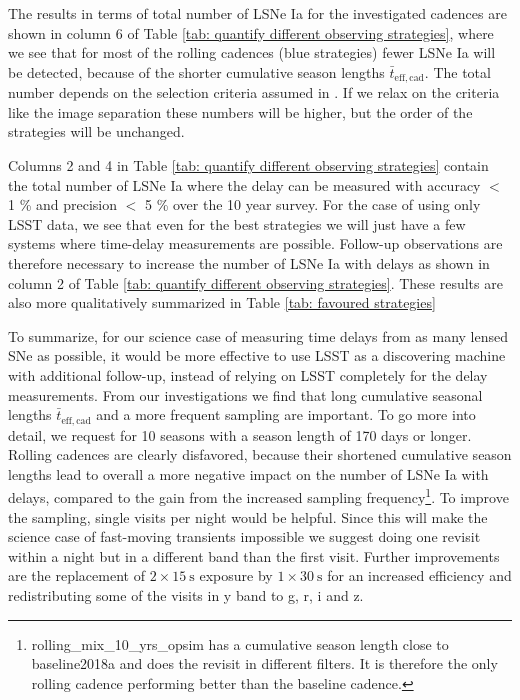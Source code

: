 The results in terms of total number of LSNe Ia for the investigated cadences are shown in column 6 of Table \ref{tab: quantify different observing strategies}, where we see that for most of the rolling cadences (blue strategies) fewer LSNe Ia will be detected, because of the shorter cumulative season lengths $\bar{t}_\mathrm{eff,cad}$. The total number depends on the selection criteria assumed in \cite{Oguri:2010}. If we relax on the criteria like the image separation these numbers will be higher, but the order of the strategies will be unchanged.

Columns 2 and 4 in Table \ref{tab: quantify different observing strategies} contain the total number of LSNe Ia where the delay can be measured with accuracy $<$ 1 \% and precision $<$ 5 \% over the 10 year survey. For the case of using only LSST data, we see that even for the best strategies we will just have
a few systems where time-delay measurements are possible. Follow-up observations are therefore necessary to
increase the number of LSNe Ia with delays as shown in column 2 of Table \ref{tab: quantify different observing strategies}. These results are also more qualitatively summarized in Table \ref{tab: favoured strategies}

To summarize, for our science case of measuring time delays from as many lensed SNe as possible, it would be more effective to use LSST as a discovering machine with additional follow-up, instead of relying on LSST completely for the delay measurements. From our investigations we find that long cumulative seasonal lengths $\bar{t}_\mathrm{eff,cad}$ and a more frequent sampling are important. To go more into detail, we request for 10 seasons with a season length of 170 days or longer. Rolling cadences are clearly disfavored, because their shortened cumulative season lengths lead to overall a more negative impact on the number of LSNe Ia with delays, compared to the gain from the increased sampling frequency\footnote{rolling\_mix\_10\_yrs\_opsim has a cumulative season length close to baseline2018a and does the revisit in different filters. It is therefore the only rolling cadence performing better than the baseline cadence.}. To improve the sampling, single visits per night would be helpful. Since this will make the science case of fast-moving transients impossible we suggest doing one revisit within a night but in a different band than the first visit. Further improvements are the replacement of $2 \times \SI{15}{\s}$ exposure by $1 \times \SI{30}{\s}$ for an increased efficiency and redistributing some of the visits in y band to g, r, i and z.
%

